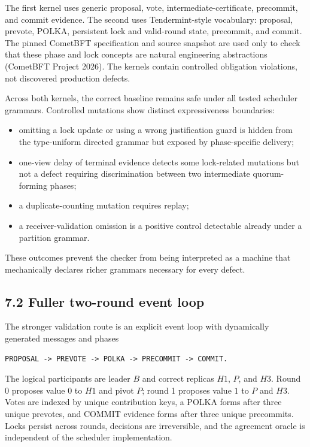 \documentclass[10pt,a4paper]{article}
\newcommand{\tightlist}{\setlength{\itemsep}{0pt}\setlength{\parskip}{0pt}}
\begin{document}
The first kernel uses generic proposal, vote, intermediate-certificate,
precommit, and commit evidence. The second uses Tendermint-style
vocabulary: proposal, prevote, POLKA, persistent lock and valid-round
state, precommit, and commit. The pinned CometBFT specification and
source snapshot are used only to check that these phase and lock
concepts are natural engineering abstractions (CometBFT Project 2026).
The kernels contain controlled obligation violations, not discovered
production defects.

Across both kernels, the correct baseline remains safe under all tested
scheduler grammars. Controlled mutations show distinct expressiveness
boundaries:

\begin{itemize}
\tightlist
\item
  omitting a lock update or using a wrong justification guard is hidden
  from the type-uniform directed grammar but exposed by phase-specific
  delivery;
\item
  one-view delay of terminal evidence detects some lock-related
  mutations but not a defect requiring discrimination between two
  intermediate quorum-forming phases;
\item
  a duplicate-counting mutation requires replay;
\item
  a receiver-validation omission is a positive control detectable
  already under a partition grammar.
\end{itemize}

These outcomes prevent the checker from being interpreted as a machine
that mechanically declares richer grammars necessary for every defect.

\subsection{7.2 Fuller two-round event
loop}\label{fuller-two-round-event-loop}

The stronger validation route is an explicit event loop with dynamically
generated messages and phases

\begin{verbatim}
PROPOSAL -> PREVOTE -> POLKA -> PRECOMMIT -> COMMIT.
\end{verbatim}

The logical participants are leader \(B\) and correct replicas \(H1\),
\(P\), and \(H3\). Round 0 proposes value \(0\) to \(H1\) and pivot
\(P\); round 1 proposes value \(1\) to \(P\) and \(H3\). Votes are
indexed by unique contribution keys, a POLKA forms after three unique
prevotes, and COMMIT evidence forms after three unique precommits. Locks
persist across rounds, decisions are irreversible, and the agreement
oracle is independent of the scheduler implementation.
\end{document}
